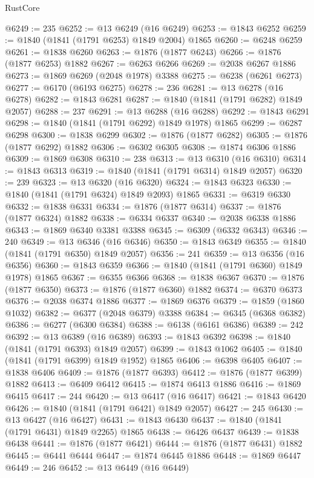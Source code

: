 \begin{lexlean}{RustCore}
\begin{coremodule}
@6249 := 235
@6252 := @13 @6249 (@16 @6249)
@6253 := @1843 @6252
@6259 := @1840 (@1841 (@1791 @6253) @1849 @2004) @1865
@6260 := @6248 @6259
@6261 := @1838 @6260
@6263 := @1876 (@1877 @6243)
@6266 := @1876 (@1877 @6253) @1882
@6267 := @6263 @6266
@6269 := @2038 @6267 @1886
@6273 := @1869 @6269 (@2048 @1978) @3388
@6275 := @6238 (@6261 @6273)
@6277 := @6170 (@6193 @6275)
@6278 := 236
@6281 := @13 @6278 (@16 @6278)
@6282 := @1843 @6281
@6287 := @1840 (@1841 (@1791 @6282) @1849 @2057)
@6288 := 237
@6291 := @13 @6288 (@16 @6288)
@6292 := @1843 @6291
@6298 := @1840 (@1841 (@1791 @6292) @1849 @1978) @1865
@6299 := @6287 @6298
@6300 := @1838 @6299
@6302 := @1876 (@1877 @6282)
@6305 := @1876 (@1877 @6292) @1882
@6306 := @6302 @6305
@6308 := @1874 @6306 @1886
@6309 := @1869 @6308
@6310 := 238
@6313 := @13 @6310 (@16 @6310)
@6314 := @1843 @6313
@6319 := @1840 (@1841 (@1791 @6314) @1849 @2057)
@6320 := 239
@6323 := @13 @6320 (@16 @6320)
@6324 := @1843 @6323
@6330 := @1840 (@1841 (@1791 @6324) @1849 @2093) @1865
@6331 := @6319 @6330
@6332 := @1838 @6331
@6334 := @1876 (@1877 @6314)
@6337 := @1876 (@1877 @6324) @1882
@6338 := @6334 @6337
@6340 := @2038 @6338 @1886
@6343 := @1869 @6340 @3381 @3388
@6345 := @6309 (@6332 @6343)
@6346 := 240
@6349 := @13 @6346 (@16 @6346)
@6350 := @1843 @6349
@6355 := @1840 (@1841 (@1791 @6350) @1849 @2057)
@6356 := 241
@6359 := @13 @6356 (@16 @6356)
@6360 := @1843 @6359
@6366 := @1840 (@1841 (@1791 @6360) @1849 @1978) @1865
@6367 := @6355 @6366
@6368 := @1838 @6367
@6370 := @1876 (@1877 @6350)
@6373 := @1876 (@1877 @6360) @1882
@6374 := @6370 @6373
@6376 := @2038 @6374 @1886
@6377 := @1869 @6376
@6379 := @1859 (@1860 @1032)
@6382 := @6377 (@2048 @6379) @3388
@6384 := @6345 (@6368 @6382)
@6386 := @6277 (@6300 @6384)
@6388 := @6138 (@6161 @6386)
@6389 := 242
@6392 := @13 @6389 (@16 @6389)
@6393 := @1843 @6392
@6398 := @1840 (@1841 (@1791 @6393) @1849 @2057)
@6399 := @1843 @1062
@6405 := @1840 (@1841 (@1791 @6399) @1849 @1952) @1865
@6406 := @6398 @6405
@6407 := @1838 @6406
@6409 := @1876 (@1877 @6393)
@6412 := @1876 (@1877 @6399) @1882
@6413 := @6409 @6412
@6415 := @1874 @6413 @1886
@6416 := @1869 @6415
@6417 := 244
@6420 := @13 @6417 (@16 @6417)
@6421 := @1843 @6420
@6426 := @1840 (@1841 (@1791 @6421) @1849 @2057)
@6427 := 245
@6430 := @13 @6427 (@16 @6427)
@6431 := @1843 @6430
@6437 := @1840 (@1841 (@1791 @6431) @1849 @2265) @1865
@6438 := @6426 @6437
@6439 := @1838 @6438
@6441 := @1876 (@1877 @6421)
@6444 := @1876 (@1877 @6431) @1882
@6445 := @6441 @6444
@6447 := @1874 @6445 @1886
@6448 := @1869 @6447
@6449 := 246
@6452 := @13 @6449 (@16 @6449)

\end{coremodule}
\end{lexlean}

